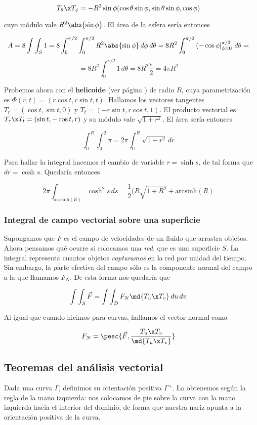 \documentclass[12pt,a4paper,titlepage]{apuntes}
\begin{document}
\[ T_\theta\x T_\phi = -R^2\sin\phi(\cos\theta\sin\phi, \sin\theta\sin\phi,\cos\phi) \]

cuyo módulo vale $R^2\abs{\sin\phi}$. El área de la esfera sería entonces

\[ A = 8\int\int_S 1 = 8\int_0^{\pi /2}\int_0^{\pi /2} R^2\abs{\sin\phi}\,d\phi\,d\theta = 8R^2\int_0^{\pi/2}\left(-\cos\phi\right|_{\phi = 0}^{\pi /2} \,d\theta = \]
\[ = 8R^2\int_0^{\pi /2} 1\,d\theta = 8 R^2\frac{\pi}{2	} = 4\pi R^2\]

Probemos ahora con el \textbf{helicoide} (ver página \pageref{Helicoide}) de radio $R$, cuya parametrización es $\Phi(r,t) = (r\cos t, r\sin t, t)$. Hallamos los vectores tangentes $T_r = (\cos t, \sin t, 0)$ y $T_t=(-r\sin t, r\cos t, 1)$. El producto vectorial es $T_r\x T_t = (\sin t, -\cos t, r)$ y su módulo vale $\sqrt{1+r^2}$. El área sería entonces

\[ \int_0^R\int_0^2\pi = 2\pi\int_0^R\sqrt{1+r^2}\,dr \]

Para hallar la integral hacemos el cambio de variable $r = \sinh s$, de tal forma que $dr = \cosh s$. Quedaría entonces

\[ 2\pi \int_{\mathrm{arcsinh}(R)} \cosh^2 s \,ds  =  \frac{1}{2} (R \sqrt{1 + R^2}+ \textrm{arcsinh} (R)\]

\subsubsection{Integral de campo vectorial sobre una superficie}

Supongamos que $F$ es el campo de velocidades de un fluido que arrastra objetos. Ahora pensamos qué ocurre si colocamos una \textit{red}, que es una superficie $S$. La integral representa cuantos objetos \textit{capturamos} en la red por unidad del tiempo. Sin embargo, la parte efectiva del campo sólo es la componente normal del campo a la que llamamos $F_N$. De esta forma nos quedaría que

\[ \int\int_S\vec{F} = \int\int_D F_N \md{T_u\x T_v}\,du\,dv \]

Al igual que cuando hicimos para curvas, hallamos el vector normal como 

\[ F_N = \pesc{\vec{F}, \frac{T_u\x T_v}{\md{T_u\x T_v}} }\]

\subsection{Teoremas del análisis vectorial}

\begin{defn}
Dada una curva $\Gamma$, definimos su orientación positiva $\Gamma^+$. La obtenemos según la regla de la mano izquierda: nos colocamos de pie sobre la curva con la mano izquierda hacia el interior del dominio, de forma que nuestra nariz apunta a la orientación positiva de la curva.
\end{defn}
\end{document}
